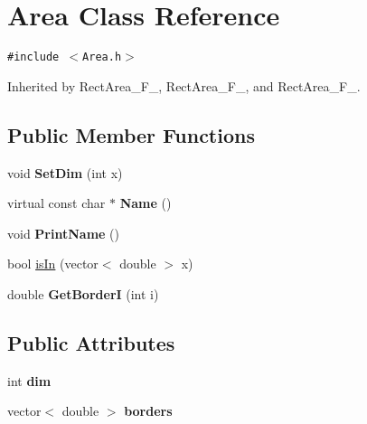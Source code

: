 \hypertarget{class_area}{
\section{Area Class Reference}
\label{class_area}
}
{\tt \#include $<$Area.h$>$}

Inherited by RectArea\_\-F\_, RectArea\_\-F\_, and RectArea\_\-F\_.

\subsection*{Public Member Functions}
\begin{CompactItemize}
\item 
\hypertarget{class_area_37a9327cc9042edd140690328416b228}{
void \textbf{SetDim} (int x)}
\label{class_area_37a9327cc9042edd140690328416b228}

\item 
\hypertarget{class_area_aeffb76f4ffad341335691ccd2aece3c}{
virtual const char $\ast$ \textbf{Name} ()}
\label{class_area_aeffb76f4ffad341335691ccd2aece3c}

\item 
\hypertarget{class_area_a2bbb5b5c50376b5352cd52301fb3ca0}{
void \textbf{PrintName} ()}
\label{class_area_a2bbb5b5c50376b5352cd52301fb3ca0}

\item 
bool \hyperlink{class_area_13129e0e7d3f3f4fc6edaeeef47996cb}{isIn} (vector$<$ double $>$ x)
\item 
\hypertarget{class_area_e03e7c9ed8cb219e2e3ccb2602fe2b38}{
double \textbf{GetBorderI} (int i)}
\label{class_area_e03e7c9ed8cb219e2e3ccb2602fe2b38}

\end{CompactItemize}
\subsection*{Public Attributes}
\begin{CompactItemize}
\item 
\hypertarget{class_area_d1b73c86b972c92515c26f9f6a78afab}{
int \textbf{dim}}
\label{class_area_d1b73c86b972c92515c26f9f6a78afab}

\item 
\hypertarget{class_area_6d7c55fe372d18d70d2ac14b40b7a81c}{
vector$<$ double $>$ \textbf{borders}}
\label{class_area_6d7c55fe372d18d70d2ac14b40b7a81c}

\end{CompactItemize}


